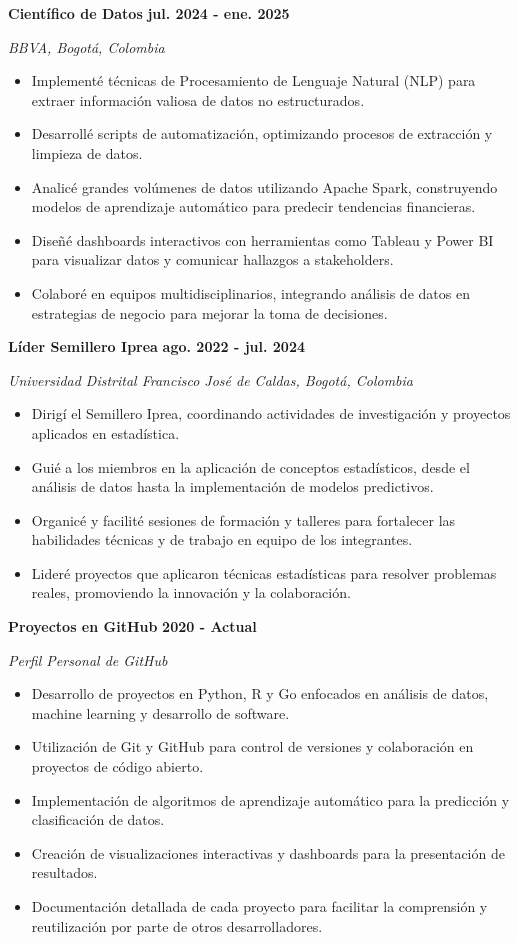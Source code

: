 \documentclass[paper=a4,fontsize=11pt]{scrartcl} %
\newcommand{\sepspace}{\vspace*{0.8em}}
\newcommand{\WorkEntry}[4]{%
  \noindent \textbf{#1} \hfill \textbf{#2} \par
  \noindent \textit{#3} \par
  \noindent \small #4 
  \normalsize \par \sepspace
}
\begin{document}
\WorkEntry{Científico de Datos}{jul. 2024 - ene. 2025}{BBVA, Bogotá, Colombia}{%
\begin{itemize}[leftmargin=*, noitemsep]
    \item Implementé técnicas de Procesamiento de Lenguaje Natural (NLP) para extraer información valiosa de datos no estructurados.
    \item Desarrollé scripts de automatización, optimizando procesos de extracción y limpieza de datos.
    \item Analicé grandes volúmenes de datos utilizando Apache Spark, construyendo modelos de aprendizaje automático para predecir tendencias financieras.
    \item Diseñé dashboards interactivos con herramientas como Tableau y Power BI para visualizar datos y comunicar hallazgos a stakeholders.
    \item Colaboré en equipos multidisciplinarios, integrando análisis de datos en estrategias de negocio para mejorar la toma de decisiones.
\end{itemize}
}

\WorkEntry{Líder Semillero Iprea}{ago. 2022 - jul. 2024}{Universidad Distrital Francisco José de Caldas, Bogotá, Colombia}{%
\begin{itemize}[leftmargin=*, noitemsep]
    \item Dirigí el Semillero Iprea, coordinando actividades de investigación y proyectos aplicados en estadística.
    \item Guié a los miembros en la aplicación de conceptos estadísticos, desde el análisis de datos hasta la implementación de modelos predictivos.
    \item Organicé y facilité sesiones de formación y talleres para fortalecer las habilidades técnicas y de trabajo en equipo de los integrantes.
    \item Lideré proyectos que aplicaron técnicas estadísticas para resolver problemas reales, promoviendo la innovación y la colaboración.
\end{itemize}
}

\WorkEntry{Proyectos en GitHub}{2020 - Actual}{Perfil Personal de GitHub}{%
\begin{itemize}[leftmargin=*, noitemsep]
    \item Desarrollo de proyectos en Python, R y Go enfocados en análisis de datos, machine learning y desarrollo de software.
    \item Utilización de Git y GitHub para control de versiones y colaboración en proyectos de código abierto.
    \item Implementación de algoritmos de aprendizaje automático para la predicción y clasificación de datos.
    \item Creación de visualizaciones interactivas y dashboards para la presentación de resultados.
    \item Documentación detallada de cada proyecto para facilitar la comprensión y reutilización por parte de otros desarrolladores.
\end{itemize}
}
\end{document}
